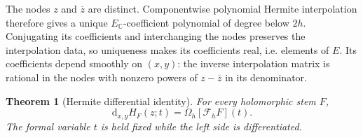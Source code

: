 \documentclass[11pt,a4paper]{article}
\numberwithin{equation}{section}
\newtheorem{theorem}{Theorem}[section]
\theoremstyle{definition}
\theoremstyle{remark}
\newcommand{\C}{\mathbb C}
\newcommand{\Fu}{\mathcal F_h}
\newcommand{\Om}{\Omega_h}
\newcommand{\barz}{\overline z}
\begin{document}
The nodes $z$ and $\barz$ are distinct. Componentwise polynomial Hermite
interpolation therefore gives a unique $E_{\C}$-coefficient polynomial of
degree below $2h$. Conjugating its coefficients and interchanging the nodes
preserves the interpolation data, so uniqueness makes its coefficients real,
i.e. elements of $E$. Its coefficients depend smoothly on $(x,y)$: the inverse
interpolation matrix is rational in the nodes with nonzero powers of
$z-\barz$ in its denominator.

\begin{theorem}[Hermite differential identity]\label{thm:hermite}
For every holomorphic stem $F$,
\begin{equation}\label{eq:hermite-identity}
 \mathrm d_{x,y}H_F(z;t)=\Om[\Fu F](t).
\end{equation}
The formal variable $t$ is held fixed while the left side is differentiated.
\end{theorem}
\end{document}
